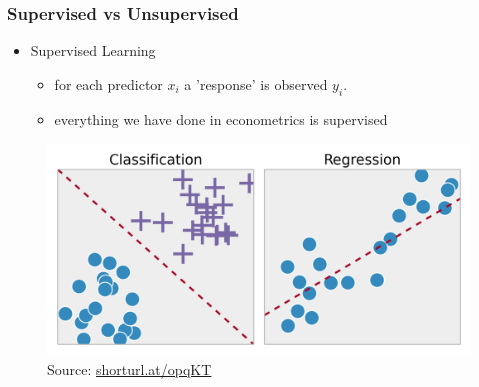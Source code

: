 \documentclass[
  shownotes,
  xcolor={svgnames},
  hyperref={colorlinks,citecolor=DarkBlue,linkcolor=DarkRed,urlcolor=DarkBlue}
  ]{beamer}
\begin{document}
\begin{frame}
\frametitle{Supervised vs Unsupervised}


\begin{itemize}
  \item Supervised Learning 
  \begin{itemize}
    \item for each predictor $x_i$ a 'response' is observed $y_i$.
    \item everything we have done in econometrics is supervised
  \end{itemize}
\end{itemize}

\bigskip
\begin{figure}[H] \centering
  \captionsetup{justification=centering}
  
    \centering
    \includegraphics[scale=0.15]{figures/supevised}
  \\
  \tiny
  Source: \url{shorturl.at/opqKT}
  \end{figure}
  
\end{frame}
\end{document}
